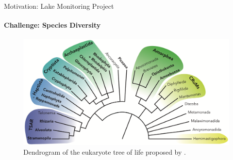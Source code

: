 \documentclass[xcolor=dvipsnames,envcountsect]{beamer}
\begin{document}
\begin{frame}{Motivation: Lake Monitoring Project}
\framesubtitle{Challenge: Species Diversity}
\begin{figure}
    \includegraphics[scale=.6]{eTOL2}
    \caption{Dendrogram of the eukaryote tree of life proposed by \cite{Burki2020}.}
\end{figure}
\end{frame}

\end{document}
